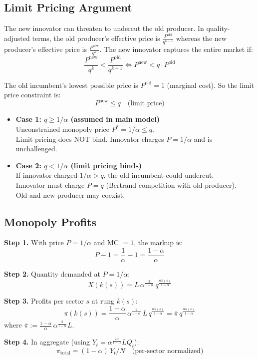 \documentclass[a4paper,11pt]{article}
\newcommand{\pibar}{\overline{\pi}}
\begin{document}
\subsection*{Limit Pricing Argument}

The new innovator can threaten to undercut the old producer. In quality-adjusted terms, the old producer's effective price is $\frac{P^{\text{old}}}{q^{k-1}}$ whereas the new producer's effective price is $\frac{P^{\text{new}}}{q^k}$. The new innovator captures the entire market if:
\[
\frac{P^{\text{new}}}{q^k} < \frac{P^{\text{old}}}{q^{k-1}} \iff P^{\text{new}} < q \cdot P^{\text{old}}
\]

The old incumbent's lowest possible price is $P^{\text{old}} = 1$ (marginal cost). So the limit price constraint is:
\[
P^{\text{new}} \leq q \quad \text{(limit price)}
\]

\begin{tcolorbox}[colback=orange!10,colframe=orange3,title=The Two Cases: $q \geq 1/\alpha$ vs.\ $q < 1/\alpha$]
\begin{itemize}
    \item \textbf{Case 1: $q \geq 1/\alpha$ (assumed in main model)} \\
          Unconstrained monopoly price $P^* = 1/\alpha \leq q$.\\
          Limit pricing does NOT bind. Innovator charges $P = 1/\alpha$ and is unchallenged.
    \item \textbf{Case 2: $q < 1/\alpha$ (limit pricing binds)} \\
          If innovator charged $1/\alpha > q$, the old incumbent could undercut.\\
          Innovator must charge $P = q$ (Bertrand competition with old producer).\\
          Old and new producer may coexist.
\end{itemize}
\end{tcolorbox}

\subsection*{Monopoly Profits}

\begin{derivationbox}[title={Derivation: Monopoly Profits (Case $q \geq 1/\alpha$)}]
\textbf{Step 1.} With price $P = 1/\alpha$ and MC $= 1$, the markup is:
\[
P - 1 = \frac{1}{\alpha} - 1 = \frac{1-\alpha}{\alpha}
\]

\textbf{Step 2.} Quantity demanded at $P = 1/\alpha$:
\[
X(k(s)) = L\, \alpha^{\frac{2}{1-\alpha}}\, q^{\frac{\alpha k(s)}{1-\alpha}}
\]

\textbf{Step 3.} Profits per sector $s$ at rung $k(s)$:
\[
\pi(k(s)) = \frac{1-\alpha}{\alpha}\, \alpha^{\frac{2}{1-\alpha}}\, L\, q^{\frac{\alpha k(s)}{1-\alpha}} = \pibar\, q^{\frac{\alpha k(s)}{1-\alpha}}
\]
where $\pibar := \frac{1-\alpha}{\alpha}\,\alpha^{\frac{2}{1-\alpha}} L$.

\textbf{Step 4.} In aggregate (using $Y_t = \alpha^{\frac{2\alpha}{1-\alpha}} L Q_t$):
\[
\pi_{\text{total}} = (1-\alpha)\,Y_t / N \quad \text{(per-sector normalized)}
\]
\end{derivationbox}
\end{document}
